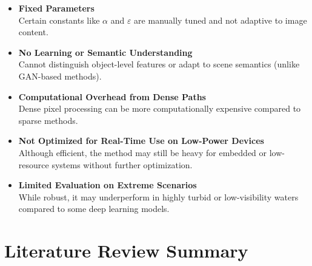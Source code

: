 \documentclass{article}
\begin{document}
\begin{itemize}
    \item \textbf{Fixed Parameters} \\
    Certain constants like $\alpha$ and $\varepsilon$ are manually tuned and not adaptive to image content.

    \item \textbf{No Learning or Semantic Understanding} \\
    Cannot distinguish object-level features or adapt to scene semantics (unlike GAN-based methods).

    \item \textbf{Computational Overhead from Dense Paths} \\
    Dense pixel processing can be more computationally expensive compared to sparse methods.

    \item \textbf{Not Optimized for Real-Time Use on Low-Power Devices} \\
    Although efficient, the method may still be heavy for embedded or low-resource systems without further optimization.

    \item \textbf{Limited Evaluation on Extreme Scenarios} \\
    While robust, it may underperform in highly turbid or low-visibility waters compared to some deep learning models.
\end{itemize}



\section{ Literature Review Summary}
\end{document}
